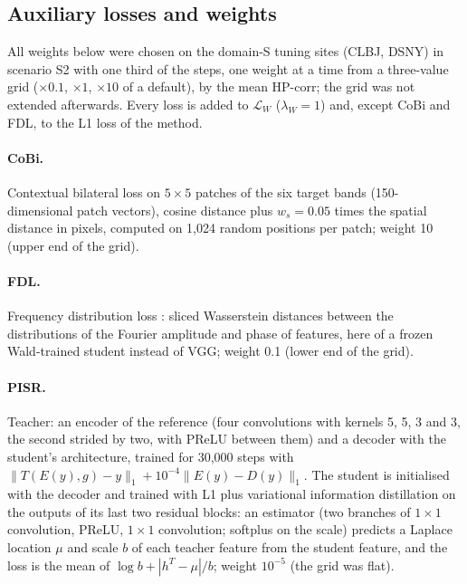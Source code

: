 \documentclass[pdflatex,sn-basic,referee,lineno]{sn-jnl}
\begin{document}
\begin{appendices}

\section{Auxiliary losses and weights}\label{app:losses}

All weights below were chosen on the domain-S tuning sites (CLBJ, DSNY) in scenario S2 with one third of the steps,
one weight at a time from a three-value grid ($\times0.1$, $\times1$, $\times10$ of a default), by the mean HP-corr;
the grid was not extended afterwards. Every loss is added to $\mathcal{L}_W$ ($\lambda_W=1$) and, except CoBi and
FDL, to the L1 loss of the method.

\paragraph{CoBi.} Contextual bilateral loss \citep{zhang2019zoom} on $5\times5$ patches of the six target bands
(150-dimensional patch vectors), cosine distance plus $w_s=0.05$ times the spatial distance in pixels, computed on
1,024 random positions per patch; weight 10 (upper end of the grid).

\paragraph{FDL.} Frequency distribution loss \citep{ni2024fdl}: sliced Wasserstein distances between the
distributions of the Fourier amplitude and phase of features, here of a frozen Wald-trained student instead of VGG; weight 0.1 (lower end of the grid).

\paragraph{PISR.} Teacher: an encoder of the reference (four convolutions with kernels 5, 5, 3 and 3, the second strided
by two, with PReLU between them) and a decoder with the student's architecture, trained for 30,000 steps with
$\lVert T(E(y), g)-y\rVert_1 + 10^{-4}\lVert E(y)-D(y)\rVert_1$. The student is initialised with the decoder and
trained with L1 plus variational information distillation \citep{ahn2019vid} on the outputs of its last two
residual blocks: an estimator (two branches of $1\times1$ convolution, PReLU, $1\times1$ convolution; softplus on
the scale) predicts a Laplace location $\mu$ and scale $b$ of each teacher feature from the student feature, and
the loss is the mean of $\log b + |h^T-\mu|/b$; weight $10^{-5}$ (the grid was flat).


\end{appendices}
\end{document}
